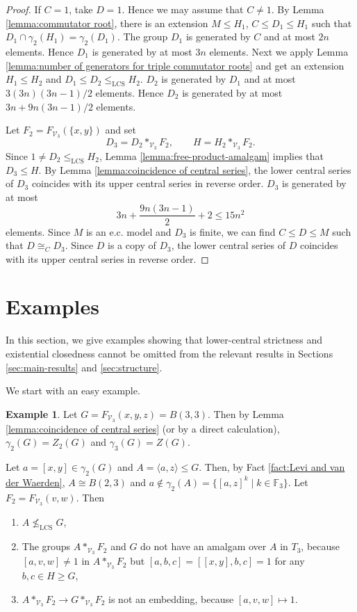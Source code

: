 \documentclass[11pt,reqno]{article}
\theoremstyle{definition}
\newtheorem{example}[theorem]{Example}
\theoremstyle{remark}
\newcommand{\LCS}{\mathrm{LCS}}
\begin{document}
\begin{proof}
    If $C=1$, take $D=1$. Hence we may assume that $C\neq 1$.
    By Lemma \ref{lemma:commutator root}, there is an
    extension $M\leq H_1$, $C\leq D_1\leq H_1$ such that 
    $D_1\cap\gamma_2(H_1)=\gamma_2(D_1)$.
    The group $D_1$ is generated by $C$ and at most $2n$ elements.  
    Hence $D_1$ is generated by at most $3n$ elements.
    Next we apply Lemma
    \ref{lemma:number of generators for triple commutator roots} and get an extension
    $H_1\leq H_2$ and $D_1\leq D_2\leq_\LCS H_2$.
    $D_2$ is generated by $D_1$ and at most $3(3n)(3n-1)/2$ elements.
    Hence $D_2$ is generated by at most $3n+9n(3n-1)/2$ elements.

    Let $F_2=F_{\mathcal V_3}(\{x,y\})$ and set
    \[
    D_3=D_2*_{\mathcal V_3}F_2,
    \qquad
    H=H_2*_{\mathcal V_3}F_2.
    \]
    Since $1\neq D_2\leq_{\LCS}H_2$, Lemma
    \ref{lemma:free-product-amalgam} implies that $D_3\leq H$.
    By Lemma \ref{lemma:coincidence of central series}, the lower central
    series of $D_3$ coincides with its upper central series in reverse order.
    $D_3$ is generated by at most
    \[
    3n+\frac{9n(3n-1)}2+2\leq 15n^2 
    \]
    elements.
    Since $M$ is an e.c. model and $D_3$ is finite, we can find $C\leq D\leq M$ such that $D\cong_C D_3$. 
    Since $D$ is a copy of $D_3$, the lower central series of $D$ coincides with its upper central series in reverse order.
\end{proof}





\section{Examples}
\label{sec:examples}
In this section, we give examples showing that lower-central strictness and
existential closedness cannot be omitted from the relevant results
in Sections \ref{sec:main-results} and \ref{sec:structure}.

We start with an easy example.
\begin{example}
    Let $G=F_{\mathcal V_3}(x,y,z)=B(3,3)$.
    Then by Lemma \ref{lemma:coincidence of central series} (or by a direct calculation), $\gamma_2(G)=Z_2(G)$ and $\gamma_3(G)=Z(G)$.
    
    Let $a=[x,y]\in \gamma_2(G)$ and $A=\langle a,z\rangle \leq G$.
    Then, by Fact \ref{fact:Levi and van der Waerden}, $A\cong B(2,3)$ and $a\not\in \gamma_2(A)=\{[a,z]^k\mid k\in \mathbb F_3\}$. 
    Let $F_2=F_{\mathcal V_3}(v,w)$. 
    Then
    \begin{enumerate}
        \item $A\not\leq_\LCS G$,
        \item The groups $A*_{\mathcal V_3}F_2$ and $G$ do not have an amalgam over $A$ in $T_3$, because $[a,v,w]\neq 1$ in $A*_{\mathcal V_3}F_2$ but $[a,b,c]=[[x,y],b,c]=1$ for any $b,c\in H\geq G$,
        \item $A*_{\mathcal V_3} F_2 \to G*_{\mathcal V_3}F_2$ is not an embedding, because $[a,v,w]\mapsto 1$.
    \end{enumerate}
\end{example}
\end{document}
